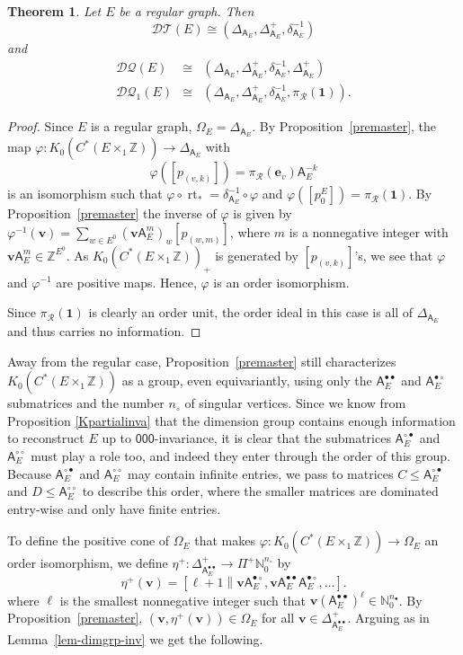 \documentclass[12pt]{amsbook}%
\newcommand{\lt}{\operatorname{rt}}
\newcommand{\ee}{{\mathbf e}}
\renewcommand{\phi}{\varphi}
\newtheorem{theor}{Theorem}[section]
\theoremstyle{defin}
\theoremstyle{remark}
\numberwithin{equation}{chapter}
\numberwithin{theor}{section}
\newcommand{\NN}{\mathbb{N}}
\newcommand{\ZZ}{\mathbb{Z}}
\newcommand{\Asf}{\mathsf{A}}
\newcommand{\xyz}[1]{\mbox{$\mathsf{#1}$}}
\newcommand{\DT}{\mathcal{DT}}
\newcommand{\DQ}{\mathcal{DQ}}
\newcommand{\DQp}{\mathcal{DQ}_1}
\newcommand{\osX}{\Pi^+}
\newcommand{\oXe}[2]{\left[#1\left\|{#2}\right.\right]}
\newcommand{\regX}{{\bullet}}
\newcommand{\singX}{{\circ}}
\newcommand{\vv}{\mathbf{v}}
\newcommand{\uu}{\mathbf{1}}
\newcommand{\nos}{{n_\singX}}
\newcommand{\nor}{{n_\regX}}
\newcommand{\pK}[1]{\pi_{\mathcal R}(#1)}
\newcommand{\adjRR}{\mathsf{A}^{\bullet\bullet}}
\newcommand{\adjRS}{\mathsf{A}^{\bullet\circ}}
\newcommand{\adjSR}{\mathsf{A}^{\circ\bullet }}
\newcommand{\adjSS}{\mathsf{A}^{\circ\circ}}
\newcommand{\nDT}{\Omega}
\begin{document}
 \begin{theor}\label{regularDQ} Let $E$ be a regular graph.  Then 
 $$
\DT(E)\cong ( \Delta_{\Asf_E}, \Delta_{\Asf_E}^+, \delta_{\Asf_E}^{-1})
$$
and
\begin{eqnarray*}
\DQ(E) &\cong&  ( \Delta_{\Asf_E}, \Delta_{\Asf_E}^+, \delta_{\Asf_E}^{-1},\Delta_{\Asf_E}^+) \\
\DQp(E)&\cong&(\Delta_{\Asf_E}, \Delta_{\Asf_E}^+, \delta_{\Asf_E}^{-1},\pK{\uu}).
\end{eqnarray*}
\end{theor}

\begin{proof}
Since $E$ is a regular graph,  $\nDT_E=\Delta_{\mathsf{A}_E}$.  By Proposition~\ref{premaster}, the map $\phi \colon K_0(C^*(E \times_1 \ZZ)) \to \Delta_{\Asf_E}$ with 
\[
\phi( [ p_{(v,k)} ] ) = \pK{\ee_v}\Asf_E^{-k}
\]
 is an isomorphism such that $\phi \circ \lt_* = \delta_{\Asf_E}^{-1} \circ \phi$ and $\phi( [p_0^E]) = \pK{\uu}$.  By Proposition~\ref{premaster} the inverse of $\phi$ is given by 
 $\phi^{-1} ( \vv ) = \sum_{w \in E^0 } (\vv \Asf_E^m)_w [ p_{(w,m)}]$, where $m$ is a nonnegative integer with $\vv \Asf_E^{m} \in \ZZ^{E^0}$.   As $K_0(C^*(E \times_1 \ZZ))_+$ is generated by $[ p_{(v,k)}]$'s, we see that $\phi$ and $\phi^{-1}$ are positive maps.  Hence, $\phi$ is an order isomorphism.
 
 Since $\pK{\uu}$ is clearly an order unit, the order ideal in this case is all of $\Delta_{\mathsf{A}_E}$ and thus carries no information.
 \end{proof}


Away from the regular case, Proposition~\ref{premaster} still characterizes $K_0(C^*(E\times_1\ZZ))$ as a group, even equivariantly, using only the $\adjRR_E$ and $\adjRS_E$ submatrices and the number $\nos$ of singular vertices. Since we know from Proposition \ref{Kpartialinva} that the dimension group contains enough information to reconstruct $E$ up to \xyz{000}-invariance, it is clear that the submatrices $\adjSR_E$ and $\adjSS_E$ must play a role too, and indeed they enter through the order of this group.
Because $\adjSR_E$ and $\adjSS_E$ may contain infinite entries, we pass to matrices $C\leq \adjSR_E$ and  $D\leq \adjSS_E$ to describe this order, where the smaller matrices are dominated  entry-wise and only have finite entries.


To define the positive cone of $\nDT_E$ that makes $\phi \colon K_0(C^*(E \times_1\ZZ))\to \nDT_E$ an order isomorphism, we define $\eta^+ \colon \Delta_{\adjRR_E}^+ \to \osX \NN_0^{\nos}$ by
$$
\eta^+( \vv ) = \oXe{\ell+1}{ \vv \adjRS_E , \vv \adjRR_E \adjRS_E, \dots}.
$$
where $\ell$ is the smallest nonnegative integer such that $\vv (\adjRR_E)^\ell \in \NN_0^\nor$.  By Proposition~\ref{premaster}, $(\vv, \eta^+(\vv)) \in \nDT_E$ for all $\vv \in \Delta_{\adjRR_E}^+$.  Arguing as in Lemma~\ref{lem-dimgrp-inv} we get the following.  
\end{document}

